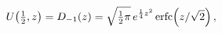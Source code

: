 \[\mathop{U\/}\nolimits\!\left(\tfrac{1}{2},z\right)=\mathop{D_{-1}\/}\nolimits%
\!\left(z\right)=\sqrt{\tfrac{1}{2}\pi}\,e^{\frac{1}{4}z^{2}}\mathop{\mathrm{%
erfc}\/}\nolimits\!\left(z/\sqrt{2}\right),\]